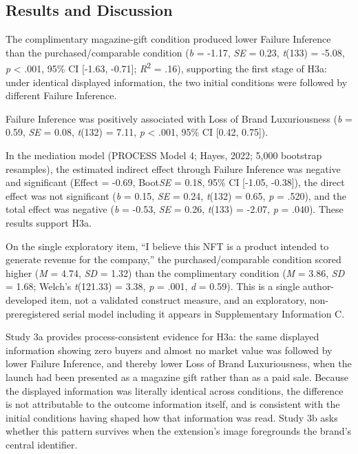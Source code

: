 \documentclass[12pt, a4paper]{article}
\begin{document}
\subsection{Results and Discussion}

The complimentary magazine-gift condition produced lower Failure Inference than the purchased/comparable condition (\emph{b} = -1.17, \emph{SE} = 0.23, \emph{t}(133) = -5.08, \emph{p} \textless{} .001, 95\% CI {[}-1.63, -0.71{]}; \emph{R}\textsuperscript{2} = .16), supporting the first stage of H3a: under identical displayed information, the two initial conditions were followed by different Failure Inference.

Failure Inference was positively associated with Loss of Brand Luxuriousness (\emph{b} = 0.59, \emph{SE} = 0.08, \emph{t}(132) = 7.11, \emph{p} \textless{} .001, 95\% CI {[}0.42, 0.75{]}).

In the mediation model (PROCESS Model 4; Hayes, 2022; 5,000 bootstrap resamples), the estimated indirect effect through Failure Inference was negative and significant (Effect = -0.69, Boot\emph{SE} = 0.18, 95\% CI {[}-1.05, -0.38{]}), the direct effect was not significant (\emph{b} = 0.15, \emph{SE} = 0.24, \emph{t}(132) = 0.65, \emph{p} = .520), and the total effect was negative (\emph{b} = -0.53, \emph{SE} = 0.26, \emph{t}(133) = -2.07, \emph{p} = .040). These results support H3a.

On the single exploratory item, ``I believe this NFT is a product intended to generate revenue for the company,'' the purchased/comparable condition scored higher (\emph{M} = 4.74, \emph{SD} = 1.32) than the complimentary condition (\emph{M} = 3.86, \emph{SD} = 1.68; Welch's \emph{t}(121.33) = 3.38, \emph{p} = .001, \emph{d} = 0.59). This is a single author-developed item, not a validated construct measure, and an exploratory, non-preregistered serial model including it appears in Supplementary Information C.

Study 3a provides process-consistent evidence for H3a: the same displayed information showing zero buyers and almost no market value was followed by lower Failure Inference, and thereby lower Loss of Brand Luxuriousness, when the launch had been presented as a magazine gift rather than as a paid sale. Because the displayed information was literally identical across conditions, the difference is not attributable to the outcome information itself, and is consistent with the initial conditions having shaped how that information was read. Study 3b asks whether this pattern survives when the extension's image foregrounds the brand's central identifier.
\end{document}

